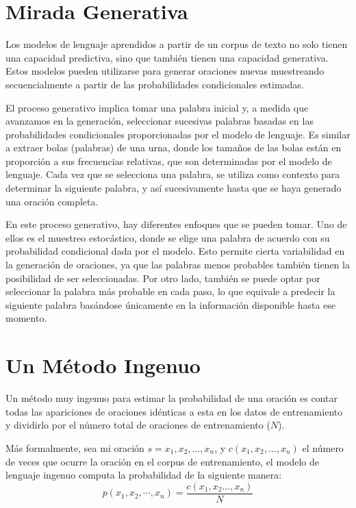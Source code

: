 \section{Mirada Generativa}

Los modelos de lenguaje aprendidos a partir de un corpus de texto no solo tienen una capacidad predictiva, sino que también tienen una capacidad generativa. Estos modelos pueden utilizarse para generar oraciones nuevas muestreando secuencialmente a partir de las probabilidades condicionales estimadas.

El proceso generativo implica tomar una palabra inicial y, a medida que avanzamos en la generación, seleccionar sucesivas palabras basadas en las probabilidades condicionales proporcionadas por el modelo de lenguaje. Es similar a extraer bolas (palabras) de una urna, donde los tamaños de las bolas están en proporción a sus frecuencias relativas, que son determinadas por el modelo de lenguaje. Cada vez que se selecciona una palabra, se utiliza como contexto para determinar la siguiente palabra, y así sucesivamente hasta que se haya generado una oración completa.

En este proceso generativo, hay diferentes enfoques que se pueden tomar. Uno de ellos es el muestreo estocástico, donde se elige una palabra de acuerdo con su probabilidad condicional dada por el modelo. Esto permite cierta variabilidad en la generación de oraciones, ya que las palabras menos probables también tienen la posibilidad de ser seleccionadas. Por otro lado, también se puede optar por seleccionar la palabra más probable en cada paso, lo que equivale a predecir la siguiente palabra basándose únicamente en la información disponible hasta ese momento. 


\section{Un Método Ingenuo}
Un método muy ingenuo para estimar la probabilidad de una oración es contar todas las apariciones de  oraciones idénticas a esta en los datos de entrenamiento y dividirlo por el número total de oraciones de entrenamiento ($N$).

Más formalmente, sea mi oración $s=x_1, x_2, \ldots, x_n$, y $c(x_1, x_2, \ldots, x_n)$  el número de veces que ocurre la oración en el corpus de entrenamiento, el modelo de lenguaje ingenuo computa la probabilidad de la siguiente manera: \begin{displaymath}
p(x_1,x_2,\cdots,x_n)=\frac{c(x_1,x_2 \dots,x_n)}{N}
\end{displaymath}

